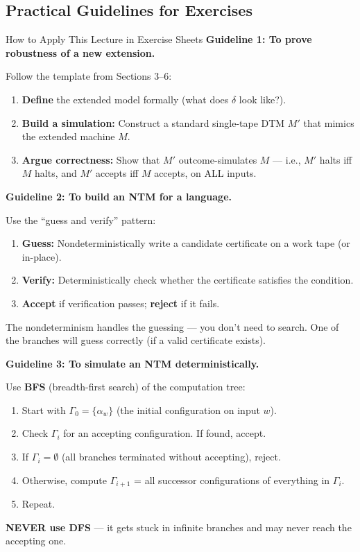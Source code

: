 \subsection{Practical Guidelines for Exercises}

\begin{examplebox}{How to Apply This Lecture in Exercise Sheets}
\textbf{Guideline 1: To prove robustness of a new extension.}

Follow the template from Sections 3--6:
\begin{enumerate}[nosep]
\item \textbf{Define} the extended model formally (what does $\delta$ look like?).
\item \textbf{Build a simulation:} Construct a standard single-tape DTM $M'$ that mimics the extended machine $M$.
\item \textbf{Argue correctness:} Show that $M'$ outcome-simulates $M$ --- i.e., $M'$ halts iff $M$ halts, and $M'$ accepts iff $M$ accepts, on ALL inputs.
\end{enumerate}

\textbf{Guideline 2: To build an NTM for a language.}

Use the ``guess and verify'' pattern:
\begin{enumerate}[nosep]
\item \textbf{Guess:} Nondeterministically write a candidate certificate on a work tape (or in-place).
\item \textbf{Verify:} Deterministically check whether the certificate satisfies the condition.
\item \textbf{Accept} if verification passes; \textbf{reject} if it fails.
\end{enumerate}
The nondeterminism handles the guessing --- you don't need to search. One of the branches will guess correctly (if a valid certificate exists).

\textbf{Guideline 3: To simulate an NTM deterministically.}

Use \textbf{BFS} (breadth-first search) of the computation tree:
\begin{enumerate}[nosep]
\item Start with $\Gamma_0 = \{\alpha_w\}$ (the initial configuration on input $w$).
\item Check $\Gamma_i$ for an accepting configuration. If found, accept.
\item If $\Gamma_i = \emptyset$ (all branches terminated without accepting), reject.
\item Otherwise, compute $\Gamma_{i+1}$ = all successor configurations of everything in $\Gamma_i$.
\item Repeat.
\end{enumerate}
\textbf{NEVER use DFS} --- it gets stuck in infinite branches and may never reach the accepting one.


\end{examplebox}
